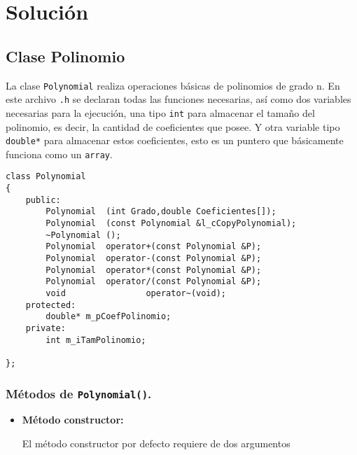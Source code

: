 \newpage

 


\section{Solución}

\subsection{Clase Polinomio}

La clase \texttt{Polynomial} realiza operaciones básicas de polinomios de grado n. En este archivo \texttt{.h} se declaran todas las funciones necesarias, así como dos variables necesarias para la ejecución, una tipo \texttt{int} para almacenar el tamaño del polinomio, es decir, la cantidad de coeficientes que posee. Y otra variable tipo \texttt{double*} para almacenar estos coeficientes, esto es un puntero que básicamente funciona como un \texttt{array}.

\begin{verbatim}
class Polynomial
{
	public:
		Polynomial	(int Grado,double Coeficientes[]);
		Polynomial	(const Polynomial &l_cCopyPolynomial);
		~Polynomial	();
		Polynomial 	operator+(const Polynomial &P);
		Polynomial 	operator-(const Polynomial &P);
		Polynomial 	operator*(const Polynomial &P);
		Polynomial	operator/(const Polynomial &P);
		void 				operator~(void);
	protected:
		double* m_pCoefPolinomio;
	private:
		int m_iTamPolinomio;

};

\end{verbatim}

\subsubsection{Métodos de \texttt{Polynomial()}.}
\begin{itemize}
    \item \textbf{Método constructor:}
    
    El método constructor por defecto requiere de dos argumentos  
\end{itemize}

